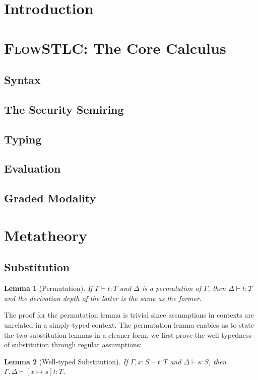 \documentclass[conference]{IEEEtran}
\newtheorem{lemma}{Lemma}
\begin{document}
\section{Introduction}

\section{\textsc{FlowSTLC}: The Core Calculus}
\subsection{Syntax}

\subsection{The Security Semiring}

\subsection{Typing}

\subsection{Evaluation}

\subsection{Graded Modality}

\section{Metatheory}
\subsection{Substitution}
\begin{lemma}[Permutation]
	If $\Gamma\vdash t:T$ and $\Delta$ is a permutation of $\Gamma$, then $\Delta\vdash t:T$ and the derivation depth of the latter is the same as the former.
\end{lemma}
The proof for the permutation lemma is trivial since assumptions in contexts are unrelated in a simply-typed context. The permutation lemma enables us to state the two substitution lemmas in a cleaner form, we first prove the well-typedness of substitution through regular assumptions:
\begin{lemma}[Well-typed Substitution] 
	If $\Gamma,x:S\vdash t:T$ and $\Delta\vdash s:S$, then $\Gamma,\Delta\vdash [x\mapsto s]t:T$.
\end{lemma}
\end{document}
